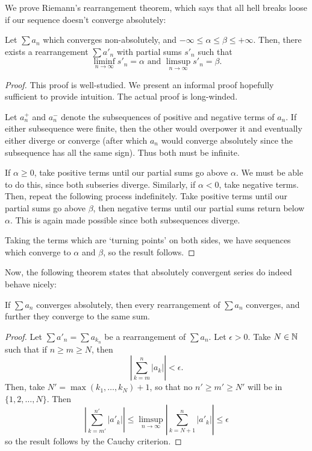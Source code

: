 We prove Riemann's rearrangement theorem, which says that all hell breaks loose if our sequence doesn't converge absolutely:
\begin{theorem} %
Let $\sum a_n$ which converges non-absolutely, and $-\infty \le \alpha \le \beta \le +\infty$. Then, there exists a rearrangement $\sum a'_n$ with partial sums $s'_n$ such that
\[
	\liminf_{n \to \infty} s'_n = \alpha \text{ and } \limsup_{n \to \infty} s'_n = \beta.
\]

\begin{proof}
This proof is well-studied. We present an informal proof hopefully sufficient to provide intuition. The actual proof is long-winded.

Let $a^+_n$ and $a^-_n$ denote the subsequences of positive and negative terms of $a_n$. If either subsequence were finite, then the other would overpower it and eventually either diverge or converge (after which $a_n$ would converge absolutely since the subsequence has all the same sign). Thus both must be infinite.

If $\alpha \ge 0$, take positive terms until our partial sums go above $\alpha$. We must be able to do this, since both subseries diverge. Similarly, if $\alpha < 0$, take negative terms. Then, repeat the following process indefinitely. Take positive terms until our partial sums go above $\beta$, then negative terms until our partial sums return below $\alpha$. This is again made possible since both subsequences diverge. 

Taking the terms which are `turning points' on both sides, we have sequences which converge to $\alpha$ and $\beta$, so the result follows.
\end{proof}
\end{theorem}

Now, the following theorem states that absolutely convergent series do indeed behave nicely:
\begin{theorem} %
If $\sum a_n$ converges absolutely, then every rearrangement of $\sum a_n$ converges, and further they converge to the same sum.

\begin{proof}
Let $\sum a'_n = \sum a_{k_n}$ be a rearrangement of $\sum a_n$. Let $\epsilon > 0$. Take $N \in \mathbb{N}$ such that if $n \ge m \ge N$, then
\[
	\left|\sum_{k=m}^{n} |a_k| \right| < \epsilon.
\]
Then, take $N' = \max(k_1, \dotsc, k_N) + 1$, so that no $n' \ge m' \ge N'$ will be in $\{1, 2, \dotsc, N\}$. Then
\[
	\left|\sum_{k=m'}^{n'} |a'_k| \right| \le \limsup_{n \to \infty} \left|\sum_{k=N+1}^{n} |a'_k| \right| \le \epsilon
\]
so the result follows by the Cauchy criterion.
\end{proof}
\end{theorem}

